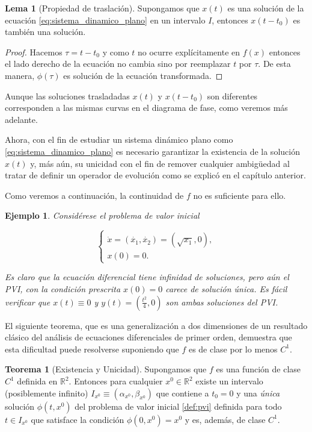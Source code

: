\documentclass[11pt]{book}
\theoremstyle{definition}
\numberwithin{definition}{section}
\theoremstyle{theorem}
\newtheorem{theorem}{Teorema}
\newtheorem{lemma}{Lema}
\numberwithin{theorem}{section}
\numberwithin{lemma}{section}
\numberwithin{corollary}{section}
\theoremstyle{plain}
\newtheorem{example}{Ejemplo}
\numberwithin{example}{section}
\newcommand{\R}{{\ensuremath{\mathbb{R}}}}
\begin{document}
\begin{lemma}[Propiedad de traslación] Supongamos que $x(t)$ es una solución de la ecuación \ref{eq:sistema_dinamico_plano} en un intervalo $I$, entonces $x(t-t_0)$ es también una solución.
\begin{proof}Hacemos $\tau = t - t_0$ y como $t$ no ocurre explícitamente en $f(x)$ entonces el lado derecho de la ecuación no cambia sino por reemplazar $t$ por $\tau$. De esta manera, $\phi(\tau)$ es solución de la ecuación transformada.
\end{proof}
\end{lemma}

Aunque las soluciones trasladadas $x(t)$ y $x(t-t_0)$ son diferentes corresponden a las mismas curvas en el diagrama de fase, como veremos más adelante.

Ahora, con el fin de estudiar un sistema dinámico plano como \ref{eq:sistema_dinamico_plano} es necesario garantizar la existencia de la solución $x(t)$ y, más aún, su unicidad con el fin de remover cualquier ambigüedad al tratar de definir un operador de evolución como se explicó en el capítulo anterior.

Como veremos a continuación, la continuidad de $f$ no es suficiente para ello.

\begin{example}Considérese el problema de valor inicial
    
$$
\left\{
    \begin{array}{l}
        \dot{x} = (\dot{x_1}, \dot{x_2}) = (\sqrt{x_1}, 0), \\
        x(0) = 0.
    \end{array}
\right.
$$

Es claro que la ecuación diferencial tiene infinidad de soluciones, pero aún el PVI, con la condición prescrita $x(0) = 0$ carece de solución única. Es fácil verificar que $x(t) \equiv 0$ y $y(t) = (\frac{t^2}{4}, 0) $ son ambas soluciones del PVI.
\end{example}

El siguiente teorema, que es una generalización a dos dimensiones de un resultado clásico del análisis de ecuaciones diferenciales de primer orden, demuestra que esta dificultad puede resolverse suponiendo que $f$ es de clase por lo menos $C^1$.

\begin{theorem}[Existencia y Unicidad] \label{teo:existenciayunicidad} Supongamos que $f$ es una función de clase $C^1$ definida en $\R^2$. Entonces para cualquier $x^0 \in \R^2$ existe un intervalo (posiblemente infinito) $I_{x^0} \equiv (\alpha_{x^0}, \beta_{x^0})$ que contiene a $t_0 = 0$ y una \emph{única} solución $\phi(t,x^0)$ del problema de valor inicial \ref{def:pvi} definida para todo $t \in I_{x^0}$ que satisface la condición $\phi(0, x^0) = x^0$ y es, además, de clase $C^1$.
\end{theorem}
\end{document}
